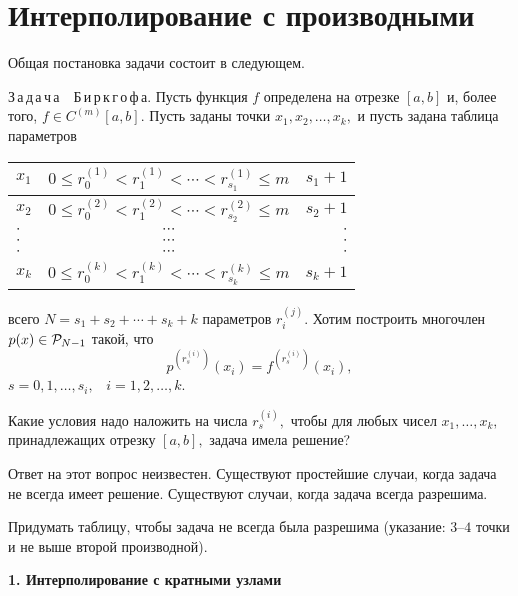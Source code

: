 
\section{Интерполирование с производными}

Общая постановка задачи состоит в следующем.

З\,а\,д\,а\,ч\,а\ \ Б\,и\,р\,к\,г\,о\,ф\,а.\quad
Пусть функция $f$
определена на отрезке $[a,b]$ и, более того, $f \in C^{(m)}[a,b].$
Пусть заданы точки
$x_1,x_2,\dots ,x_k,$
и пусть задана таблица параметров
\vspace{3mm}
\begin{center}
\begin{tabular}{|l||c|r|} \hline
$x_1$ & $0 \le r_0^{(1)} < r_1^{(1)}< \cdots < r_{s_1}^{(1)} \le m$ & $s_1+1$ \\  \hline
$x_2$ & $0 \le r_0^{(2)} < r_1^{(2)}< \cdots < r_{s_2}^{(2)} \le m$ & $s_2+1$ \\  \hline
$\cdot$ & $\cdots$  & $\cdot$ \\  \hline
$\cdot$ & $\cdots$  & $\cdot$ \\  \hline
$\cdot$ & $\cdots$  & $\cdot$ \\  \hline
$x_k$ & $0 \le r_0^{(k)} < r_1^{(k)}< \cdots < r_{s_k}^{(k)} \le m$ & $s_k+1$ \\  \hline
\end{tabular}
\end{center}
\vspace{3mm}
всего $N=s_1+s_2+\cdots +s_k+k$
параметров {$r_i^{(j)}$}. Хотим построить многочлен
$p(x) \in \mathcal{P}_{N-1}$ такой, что
\[
  p^{(r_s^{(i)})}(x_i)=f^{(r_s^{(i)})}(x_i),
\]
$s=0,1,\dots,s_i,$~ $i=1,2,\dots ,k.$

Какие условия надо наложить на числа
$r_s^{(i)},$ чтобы для любых чисел $x_1,\dots ,x_k,$
принадлежащих отрезку $[a,b],$
задача имела решение?


Ответ на этот вопрос неизвестен.
Существуют простейшие случаи, когда задача не всегда
имеет решение.
Существуют случаи, когда задача всегда разрешима.

\ex Придумать таблицу, чтобы задача не всегда была разрешима
(указание: {$3$--$4$} точки и не выше второй производной).

\vspace{3mm}
{\bf 1. Интерполирование с кратными узлами}
\vspace{3mm}


